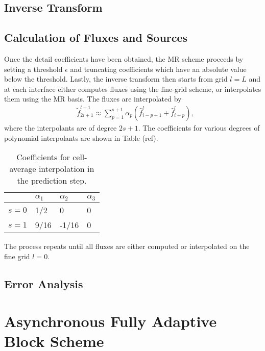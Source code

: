 \documentclass{article}
\begin{document}
    \subsection*{Inverse Transform}

        
    \subsection*{Calculation of Fluxes and Sources}
        Once the detail coefficients have been obtained, the MR scheme
        proceeds by setting a threshold $\epsilon$ and truncating coefficients
        which have an absolute value below the threshold. Lastly, the inverse
        transform then starts from grid $l=L$ and at each interface either
        computes fluxes using the fine-grid scheme, or interpolates them using
        the MR basis. The fluxes are interpolated by
        \begin{align}
            & \tilde{f}_{2i+1}^{l-1} \approx \sum_{p=1}^{s+1} \alpha_{p} \left(
            \hat{f}^{l}_{i-p+1} + \hat{f}^{l}_{i+p} \right),
        \end{align}
        where the interpolants are of degree $2s+1$. The coefficients for
        various degrees of polynomial interpolants are shown in Table (ref).
        \begin{table}
            \centering
            \begin{tabular}{|l|l|l|l|}
            \hline
                & $\alpha_{1}$ & $\alpha_{2}$ & $\alpha_{3}$ \\ \hline
                $s=0$ & 1/2 & 0 & 0 \\ \hline
                $s=1$ & 9/16 & -1/16 & 0 \\ \hline
            \end{tabular}
            \caption{Coefficients for cell-average interpolation in the prediction step.}
        \end{table}
        The process repeats until all fluxes are either computed or
        interpolated on the fine grid $l=0$.

        \subsection*{Error Analysis}


\section{Asynchronous Fully Adaptive Block Scheme}
\end{document}

